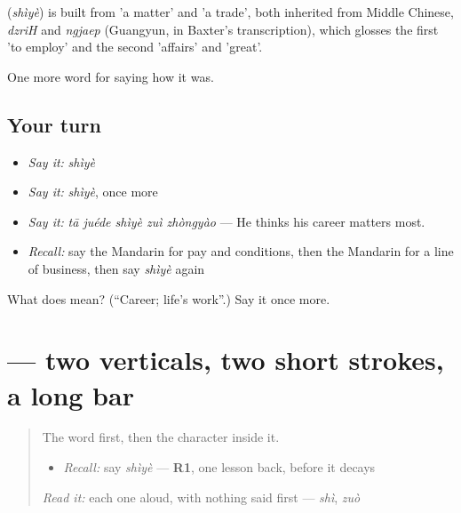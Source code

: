 \begin{cousinweb}
\textbf{} (\emph{shìyè}) is built from  'a matter' and  'a trade', both inherited from Middle Chinese, \emph{dzriH} and \emph{ngjaep} (Guangyun, in Baxter's transcription), which glosses the first 'to employ' and the second 'affairs' and 'great'.
\end{cousinweb}

\begin{grammarlens}[title={What you've built}]
One more word for saying how it was.
\end{grammarlens}

\subsection*{Your turn}
\begin{itemize}
\raggedright
  \item \emph{Say it:} \emph{shìyè}
  \item \emph{Say it:} \emph{shìyè}, once more
  \item \emph{Say it:} \emph{tā juéde shìyè zuì zhòngyào} — He thinks his career matters most.
  \item \emph{Recall:} say the Mandarin for pay and conditions, then the Mandarin for a line of business, then say \emph{shìyè} again
\end{itemize}

\begin{tcolorbox}[breakable,colback=teal!4,colframe=teal!35!black,title={Before you move on}]
What does  mean? (\textquotedblleft{}Career; life's work\textquotedblright{}.) Say it once more.
\end{tcolorbox}
\section[\texorpdfstring{\zh{业} (yè)}{业 (yè)}]{ — two verticals, two short strokes, a long bar}

\label{lesson:ZH-W487-ye-career}



\begin{quote}
The word first, then the character inside it.

\begin{itemize}
\raggedright
  \item \emph{Recall:} say \emph{shìyè} — \textbf{R1}, one lesson back, before it decays
\end{itemize}

\begin{quote}
 
\end{quote}

\emph{Read it:} each one aloud, with nothing said first — \emph{shì}, \emph{zuò}
\end{quote}

